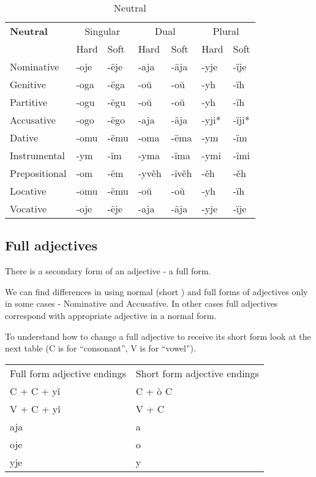 \begin{table}[!htb]
	\caption{Neutral}
	\begin{tabular}{lllllll}
		\textbf{Neutral}       
		& \multicolumn{2}{c}{Singular} 
		& \multicolumn{2}{c}{Dual} 
		& \multicolumn{2}{c}{Plural} \\
		& Hard   & Soft  & Hard   & Soft   & Hard  & Soft \\
		Nominative    & -oje & -ëje     
		& -aja  & -äja        
		& -yje & -ïje \\
		Genitive      & -oga & -ëga 
		& -oŭ & -oŭ
		& -yh & -ïh \\
		Partitive     & -ogu & -ëgu 
		& -oŭ & -oŭ
		& -yh & -ïh \\
		Accusative    & -ogo & -ëgo     
		& -aja & -äja
		& -yji* & -ïji*  \\
		Dative		  & -omu & -ëmu
		& -oma & -ëma 
		& -ym & -ïm \\  
		Instrumental  & -ym & -ïm     
		& -yma & -ïma   
		& -ymi & -ïmi \\
		Prepositional & -om & -ëm  
		& -yvěh & -ïvěh     
		& -ěh & -ěh \\
		Locative      & -omu & -ëmu      
		& -oŭ & -oŭ
		& -yh & -ïh \\
		Vocative       & -oje & -ëje     
		& -aja  & -äja        
		& -yje & -ïje 
	\end{tabular}
\end{table}

\subsection{Full adjectives}

There is a secondary form of an adjective - a full form.

We can find differences in using normal (short ) and full forms of adjectives only in some cases - Nominative and Accusative. In other cases full adjectives correspond with appropriate adjective in a normal form.

To understand how to change a full adjective to receive its short form look at the next table (C is for “consonant”, V is for “vowel”).

\begin{table}
	\begin{tabular}{ll}
		Full form adjective endings & Short form adjective endings \\
		C + C + yǐ & C + ò C \\
	    V + C + yǐ & V + C \\
		aja & a \\
		oje  & o \\
		yje & y \\
	\end{tabular}
\end{table}

